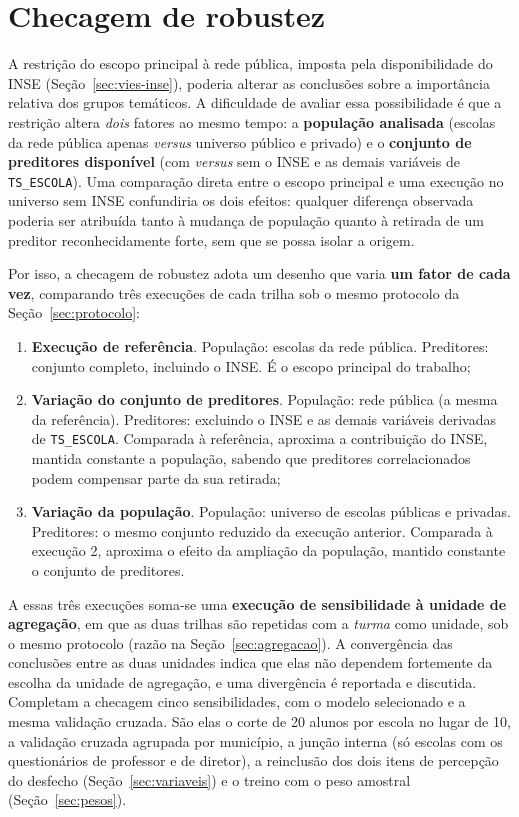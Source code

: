 \section{Checagem de robustez}
\label{sec:robustez}

A restrição do escopo principal à rede pública, imposta pela
disponibilidade do INSE (Seção~\ref{sec:vies-inse}), poderia alterar as
conclusões sobre a importância relativa dos grupos temáticos. A
dificuldade de avaliar essa possibilidade é que a restrição altera
\emph{dois} fatores ao mesmo tempo: a \textbf{população analisada} (escolas
da rede pública apenas \textit{versus} universo público e privado) e o
\textbf{conjunto de preditores disponível} (com \textit{versus} sem o INSE e
as demais variáveis de \texttt{TS\_ESCOLA}). Uma comparação direta entre o
escopo principal e uma execução no universo sem INSE confundiria os dois
efeitos: qualquer diferença observada poderia ser atribuída tanto à mudança
de população quanto à retirada de um preditor reconhecidamente forte, sem
que se possa isolar a origem.

Por isso, a checagem de robustez adota um desenho que varia \textbf{um fator
de cada vez}, comparando três execuções de cada trilha sob o mesmo
protocolo da Seção~\ref{sec:protocolo}:

\begin{enumerate}
    \item \textbf{Execução de referência}. População: escolas da rede
    pública. Preditores: conjunto completo, incluindo o INSE. É o escopo
    principal do trabalho;
    \item \textbf{Variação do conjunto de preditores}. População: rede
    pública (a mesma da referência). Preditores: excluindo o INSE e as
    demais variáveis derivadas de \texttt{TS\_ESCOLA}. Comparada à
    referência, aproxima a contribuição do INSE, mantida constante a
    população, sabendo que preditores correlacionados podem compensar parte
    da sua retirada;
    \item \textbf{Variação da população}. População: universo de escolas
    públicas e privadas. Preditores: o mesmo conjunto reduzido da execução
    anterior. Comparada à execução 2, aproxima o efeito da ampliação da
    população, mantido constante o conjunto de preditores.
\end{enumerate}

A essas três execuções soma-se uma \textbf{execução de sensibilidade à
unidade de agregação}, em que as duas trilhas são repetidas com a
\emph{turma} como unidade, sob o mesmo protocolo (razão na
Seção~\ref{sec:agregacao}). A convergência das conclusões
entre as duas unidades indica que elas não dependem fortemente da escolha
da unidade de agregação, e uma divergência é reportada e discutida.
Completam a checagem cinco sensibilidades, com o modelo selecionado e a
mesma validação cruzada. São elas o corte de 20 alunos por escola no lugar
de 10, a validação cruzada agrupada por município, a junção interna (só
escolas com os questionários de professor e de diretor), a reinclusão dos
dois itens de percepção do desfecho (Seção~\ref{sec:variaveis}) e o treino
com o peso amostral (Seção~\ref{sec:pesos}).


